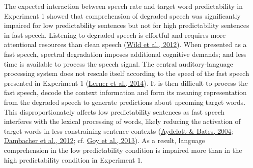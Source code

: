 \documentclass[a4paper, nobind]{templates/ociamthesis}
\begin{document}
The expected interaction between speech rate and target word predictability in Experiment 1 showed that comprehension of degraded speech was significantly impaired for low predictability sentences but not for high predictability sentences in fast speech.
Listening to degraded speech is effortful and requires more attentional resources than clean speech (\protect\hyperlink{ref-Wild2012}{Wild et al., 2012}).
When presented as a fast speech, spectral degradation imposes additional cognitive demands; and less time is available to process the speech signal.
The central auditory-language processing system does not rescale itself according to the speed of the fast speech presented in Experiment 1 (\protect\hyperlink{ref-Lerner2014}{Lerner et al., 2014}).
It is then difficult to process the fast speech, decode the context information and form its meaning representation from the degraded speech to generate predictions about upcoming target words.
This disproportionately affects low predictability sentences as fast speech interferes with the lexical processing of words, likely reducing the activation of target words in less constraining sentence contexts (\protect\hyperlink{ref-Aydelott2004}{Aydelott \& Bates, 2004}; \protect\hyperlink{ref-Dambacher2012}{Dambacher et al., 2012}; cf. \protect\hyperlink{ref-Goy2013}{Goy et al., 2013}).
As a result, language comprehension in the low predictability condition is impaired more than in the high predictability condition in Experiment 1.
\end{document}
